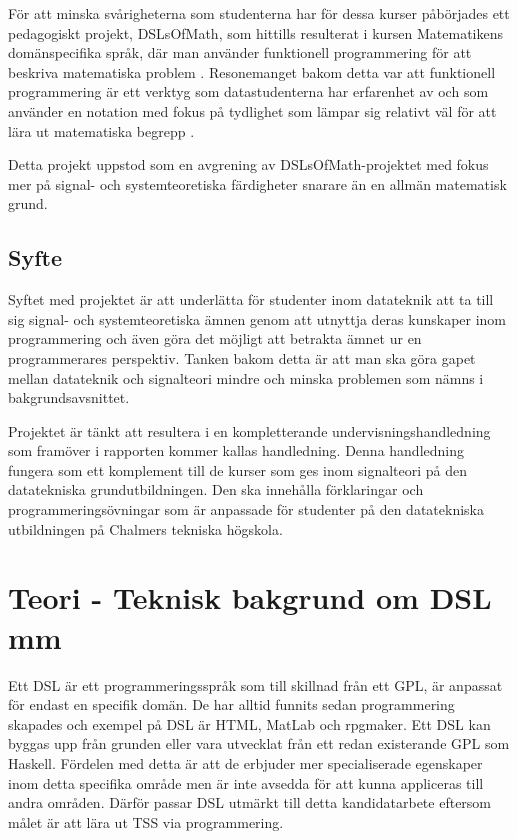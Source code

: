 \documentclass[]{article}
\begin{document}
För att minska svårigheterna som studenterna har för dessa kurser påbörjades
ett pedagogiskt projekt, DSLsOfMath, som hittills resulterat i kursen
Matematikens domänspecifika språk, där man använder funktionell
programmering för att beskriva matematiska problem \cite{kursplan:dslsofmath}.
Resonemanget bakom detta var att funktionell programmering är ett verktyg
som datastudenterna har erfarenhet av och som använder en notation med
fokus på tydlighet som lämpar sig relativt väl för att lära ut matematiska
begrepp \cite{TFPIE15_DSLsofMath_IonescuJansson}.

Detta projekt uppstod som en avgrening av DSLsOfMath-projektet med fokus mer på signal- och systemteoretiska färdigheter snarare än en allmän matematisk grund.

\subsection{Syfte}

%

Syftet med projektet är att underlätta för studenter inom datateknik att
ta till sig signal- och systemteoretiska ämnen genom att utnyttja deras
kunskaper inom programmering och även göra det möjligt att betrakta ämnet ur
en programmerares perspektiv. Tanken bakom detta är att man ska göra gapet
mellan datateknik och signalteori mindre och minska problemen som nämns
i bakgrundsavsnittet.

Projektet är tänkt att resultera i en kompletterande undervisningshandledning som
framöver i rapporten kommer kallas handledning.
Denna handledning fungera som ett komplement till de kurser som ges inom
signalteori på den datatekniska grundutbildningen. Den ska innehålla
förklaringar och programmeringsövningar som är anpassade för studenter på den
datatekniska utbildningen på Chalmers tekniska högskola.

\section{Teori - Teknisk bakgrund om DSL mm}

Ett DSL är ett programmeringsspråk som till skillnad från ett GPL, är anpassat
för endast en specifik domän. De har alltid funnits sedan programmering
skapades och exempel på DSL är HTML, MatLab och rpgmaker. Ett DSL kan
byggas upp från grunden eller vara utvecklat från ett redan existerande GPL
som Haskell. Fördelen med detta är att de erbjuder mer specialiserade egenskaper
inom detta specifika område men är inte avsedda för att kunna appliceras till andra
områden. Därför passar DSL utmärkt till detta kandidatarbete eftersom målet är
att lära ut TSS via programmering.
\end{document}
